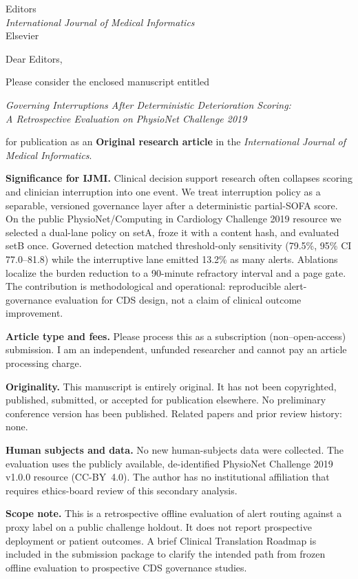 \documentclass[10pt]{letter}
\date{\today}
\renewcommand*{\opening}[1]{\vspace*{-1.2em}{\raggedright \toname \\ \toaddress
  \vspace{1.2em}\par}%
  \noindent #1\par\vspace{0.6em}}
\begin{document}
\begin{letter}{Editors\\
\textit{International Journal of Medical Informatics}\\
Elsevier}

\opening{Dear Editors,}

Please consider the enclosed manuscript entitled

\begin{center}\itshape
Governing Interruptions After Deterministic Deterioration Scoring:\\
A Retrospective Evaluation on PhysioNet Challenge 2019
\end{center}

for publication as an \textbf{Original research article} in the
\textit{International Journal of Medical Informatics}.

\textbf{Significance for IJMI.}
Clinical decision support research often collapses scoring and clinician
interruption into one event. We treat interruption policy as a separable,
versioned governance layer after a deterministic partial-SOFA score. On the
public PhysioNet/Computing in Cardiology Challenge 2019 resource we selected a
dual-lane policy on setA, froze it with a content hash, and evaluated setB once.
Governed detection matched threshold-only sensitivity (79.5\%, 95\% CI
77.0--81.8) while the interruptive lane emitted 13.2\% as many alerts.
Ablations localize the burden reduction to a 90-minute refractory interval and a
page gate. The contribution is methodological and operational: reproducible
alert-governance evaluation for CDS design, not a claim of clinical outcome
improvement.

\textbf{Article type and fees.}
Please process this as a subscription (non--open-access) submission. I am an
independent, unfunded researcher and cannot pay an article processing charge.

\textbf{Originality.}
This manuscript is entirely original. It has not been copyrighted, published,
submitted, or accepted for publication elsewhere. No preliminary conference
version has been published. Related papers and prior review history: none.

\textbf{Human subjects and data.}
No new human-subjects data were collected. The evaluation uses the publicly
available, de-identified PhysioNet Challenge 2019 v1.0.0 resource (CC-BY~4.0).
The author has no institutional affiliation that requires ethics-board review of
this secondary analysis.

\textbf{Scope note.}
This is a retrospective offline evaluation of alert routing against a proxy
label on a public challenge holdout. It does not report prospective deployment
or patient outcomes. A brief Clinical Translation Roadmap is included in the
submission package to clarify the intended path from frozen offline evaluation
to prospective CDS governance studies.


\end{letter}
\end{document}
